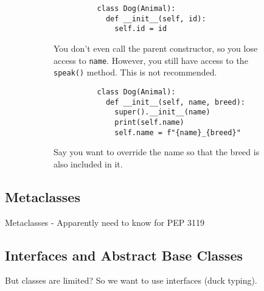 \begin{example}
\begin{figure}[H]
      \begin{subfigure}[b]{0.48\textwidth}
        \centering
        \begin{lstlisting}
          class Dog(Animal): 
            def __init__(self, id): 
              self.id = id
        \end{lstlisting}
        \caption{You don't even call the parent constructor, so you lose access to \texttt{name}. However, you still have access to the \texttt{speak()} method. This is not recommended.}
      \end{subfigure}
      \hfill 
      \begin{subfigure}[b]{0.48\textwidth}
        \centering
        \begin{lstlisting}
          class Dog(Animal): 
            def __init__(self, name, breed): 
              super().__init__(name)  
              print(self.name)
              self.name = f"{name}_{breed}"
        \end{lstlisting}
        \caption{Say you want to override the name so that the breed is also included in it.}
      \end{subfigure}
      \caption{}
    \end{figure}
  \end{example}

  \begin{definition}
    
  \end{definition}

\subsection{Metaclasses}

  Metaclasses 
    - Apparently need to know for PEP 3119

\subsection{Interfaces and Abstract Base Classes} 

  But classes are limited? So we want to use interfaces (duck typing).  


